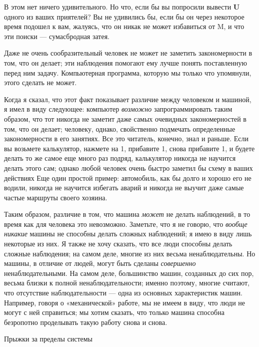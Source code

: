 В этом нет ничего удивительного. Но что, если бы вы попросили вывести \textbf{U} одного из ваших приятелей? Вы не удивились бы, если бы он через некоторое время подошел к вам, жалуясь, что он никак не может избавиться от M, и что эти поиски --- сумасбродная затея.

Даже не очень сообразительный человек не может не заметить закономерности в том, что он делает; эти наблюдения помогают ему лучше понять поставленную перед ним задачу. Компьютерная программа, которую мы только что упомянули, этого сделать не может.

Когда я сказал, что этот факт показывает различие между человеком и машиной, я имел в виду следующее: компьютер \emph{возможно} запрограммировать таким образом, что тот никогда не заметит даже самых очевидных закономерностей в том, что он делает; человеку, однако, свойственно подмечать определенные закономерности в его занятиях. Все это читатель, конечно, знал и раньше. Если вы возьмете калькулятор, нажмете на 1, прибавите 1, снова прибавите 1, и будете делать то же самое еще много раз подряд, калькулятор никогда не научится делать этого сам; однако любой человек очень быстро заметил бы схему в ваших действиях Еще один простой пример: автомобиль, как бы долго и хорошо его не водили, никогда не научится избегать аварий и никогда не выучит даже самые частые маршруты своего хозяина.

Таким образом, различие в том, что машина \emph{может} не делать наблюдений, в то время как для человека это невозможно. Заметьте, что я не говорю, что \emph{вообще никакие} машины не способны делать сложных наблюдений; я имею в виду лишь некоторые из них. Я также не хочу сказать, что все люди способны делать сложные наблюдения; на самом деле, многие из них весьма ненаблюдательны. Но машины, в отличие от людей, могут быть сделаны \emph{совершенно} ненаблюдательными. На самом деле, большинство машин, созданных до сих пор, весьма близки к полной ненаблюдательности; именно поэтому, многие считают, что отсутствие наблюдательности --- одна из основных характеристик машин. Например, говоря о «механической» работе, мы не имеем в виду, что люди не могут с ней справиться; мы хотим сказать, что только машина способна безропотно проделывать такую работу снова и снова.

Прыжки за пределы системы

